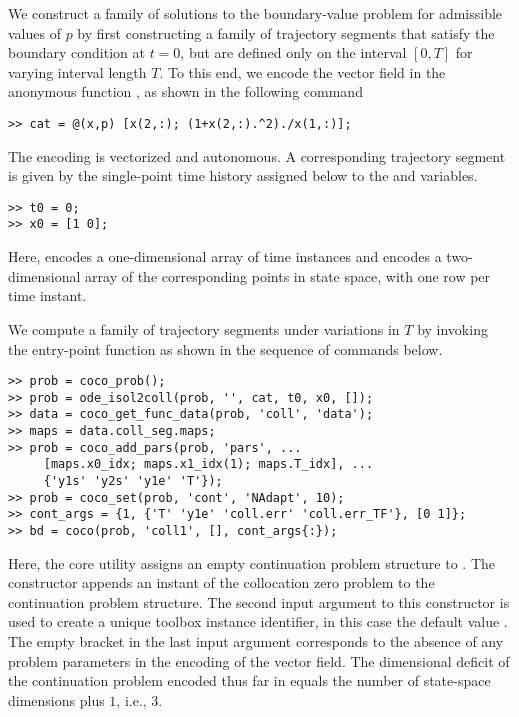We construct a family of solutions to the boundary-value problem for admissible values of $p$ by first constructing a family of trajectory segments that satisfy the boundary condition at $t=0$, but are defined only on the interval $[0,T]$ for varying interval length $T$. To this end, we encode the vector field in the anonymous function , as shown in the following command
\begin{lstlisting}[language=coco-highlight]
>> cat = @(x,p) [x(2,:); (1+x(2,:).^2)./x(1,:)];
\end{lstlisting}
The encoding is vectorized and autonomous. A corresponding trajectory segment is given by the single-point time history assigned below to the  and  variables.
\begin{lstlisting}[language=coco-highlight]
>> t0 = 0;
>> x0 = [1 0];
\end{lstlisting}
Here,  encodes a one-dimensional array of time instances and  encodes a two-dimensional array of the corresponding points in state space, with one row per time instant.

We compute a family of trajectory segments under variations in $T$ by invoking the  entry-point function as shown in the sequence of commands below.
\begin{lstlisting}[language=coco-highlight]
>> prob = coco_prob();
>> prob = ode_isol2coll(prob, '', cat, t0, x0, []);
>> data = coco_get_func_data(prob, 'coll', 'data');
>> maps = data.coll_seg.maps;
>> prob = coco_add_pars(prob, 'pars', ...
     [maps.x0_idx; maps.x1_idx(1); maps.T_idx], ...
     {'y1s' 'y2s' 'y1e' 'T'});
>> prob = coco_set(prob, 'cont', 'NAdapt', 10);
>> cont_args = {1, {'T' 'y1e' 'coll.err' 'coll.err_TF'}, [0 1]};
>> bd = coco(prob, 'coll1', [], cont_args{:});
\end{lstlisting}
Here, the  core utility assigns an empty continuation problem structure to . The  constructor appends an instant of the collocation zero problem to the continuation problem structure. The second input argument to this constructor is used to create a unique toolbox instance identifier, in this case the default value . The empty bracket in the last input argument corresponds to the absence of any problem parameters in the encoding of the vector field. The dimensional deficit of the continuation problem encoded thus far in  equals the number of state-space dimensions plus $1$, i.e., $3$.

